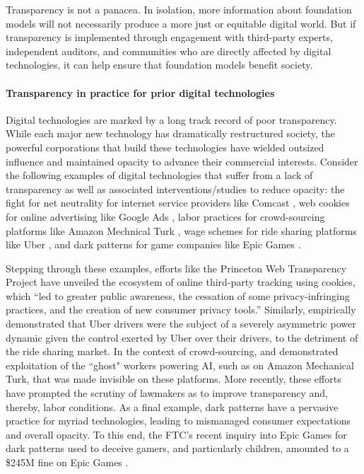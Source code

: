 Transparency is not a panacea. 
In isolation, more information about foundation models will not necessarily produce a more just or equitable digital world. 
But if transparency is implemented through engagement with third-party experts, independent auditors, and communities who are directly affected by digital technologies, it can help ensure that foundation models benefit society.

\paragraph{Transparency in practice for prior digital technologies}
Digital technologies are marked by a long track record of poor transparency.
While each major new technology has dramatically restructured society, the powerful corporations that build these technologies have wielded outsized influence and maintained opacity to advance their commercial interests.
Consider the following examples of digital technologies that suffer from a lack of transparency as well as associated interventions/studies to reduce opacity:
the fight for net neutrality for internet service providers like Comcast \citep{crs2021netneutrality}, web cookies for online advertising like Google Ads \citep{englehardt2015cookies,englehardt2016online,narayanan2017princeton}, labor practices for crowd-sourcing platforms like Amazon Mechnical Turk \citep{gray2019ghost, crawford2021atlas}, wage schemes for ride sharing platforms like Uber \citep{rosenblat2016algorithmic}, and dark patterns for game companies like Epic Games \citep{ftc2023epicgames}.

Stepping through these examples, efforts like the Princeton Web Transparency Project \citep{englehardt2015cookies,englehardt2016online,narayanan2017princeton} have unveiled the ecosystem of online third-party tracking using cookies, which ``led to greater public awareness, the cessation of some privacy-infringing
practices, and the creation of new consumer privacy tools.''
Similarly, \citet{rosenblat2016algorithmic} empirically demonstrated that Uber drivers were the subject of a severely asymmetric power dynamic given the control exerted by Uber over their drivers, to the detriment of the ride sharing market.
In the context of crowd-sourcing, \citet{gray2019ghost} and \citet{crawford2021atlas} demonstrated exploitation of the ``ghost" workers powering AI, such as on Amazon Mechanical Turk, that was made invisible on these platforms.
More recently, these efforts have prompted the scrutiny of lawmakers as to improve transparency and, thereby, labor conditions.
As a final example, dark patterns have a pervasive practice for myriad technologies, leading to mismanaged consumer expectations and overall opacity. 
To this end, the FTC's recent inquiry into Epic Games for dark patterns used to deceive gamers, and particularly children, amounted to a \$245M fine on Epic Games \citep{ftc2023epicgames}.

